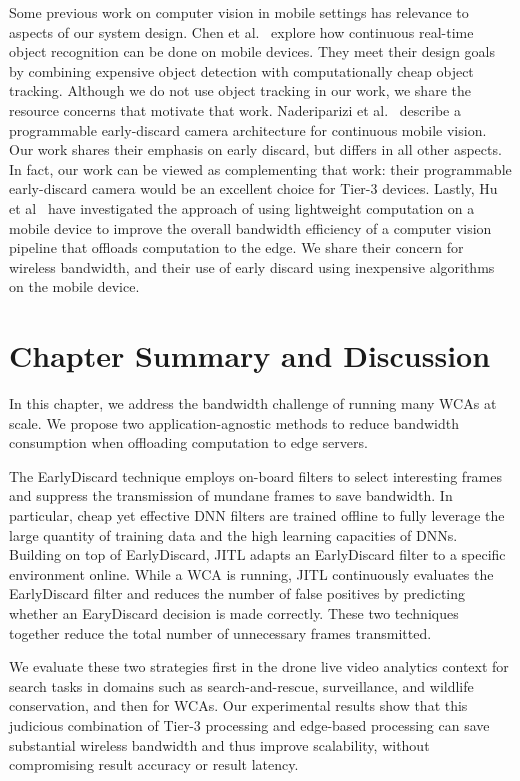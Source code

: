 Some previous work on computer vision in mobile settings has relevance to
aspects of our system design.  Chen et al.~\cite{chen2015glimpse} explore how
continuous real-time object recognition can be done on mobile devices. They meet
their design goals by combining expensive object detection with computationally
cheap object tracking.  Although we do not use object tracking in our work, we
share the resource concerns that motivate that work.  Naderiparizi et
al.~\cite{naderiparizi2017glimpse} describe a programmable early-discard camera
architecture for continuous mobile vision.  Our work shares their emphasis on
early discard, but differs in all other aspects.  In fact, our work can be
viewed as complementing that work: their programmable early-discard camera would
be an excellent choice for Tier-3 devices. Lastly, Hu et al~\cite{Hu2015} have
investigated the approach of using lightweight computation on a mobile device to
improve the overall bandwidth efficiency of a computer vision pipeline that
offloads computation to the edge.  We share their concern for wireless
bandwidth, and their use of early discard using inexpensive algorithms on the
mobile device.

\section{Chapter Summary and Discussion}
\label{bw:discussion}

In this chapter, we address the bandwidth challenge of running many WCAs at
scale. We propose two application-agnostic methods to reduce bandwidth
consumption when offloading computation to edge servers. 

The EarlyDiscard technique employs on-board filters to select interesting frames
and suppress the transmission of mundane frames to save bandwidth. In
particular, cheap yet effective DNN filters are trained offline to fully
leverage the large quantity of training data and the high learning capacities of
DNNs. Building on top of EarlyDiscard, JITL adapts an EarlyDiscard filter to a
specific environment online. While a WCA is running, JITL continuously evaluates
the EarlyDiscard filter and reduces the number of false positives by predicting
whether an EaryDiscard decision is made correctly. These two techniques together
reduce the total number of unnecessary frames transmitted. 

We evaluate these two strategies first in the drone live video analytics context
for search tasks in domains such as search-and-rescue, surveillance, and
wildlife conservation, and then for WCAs. Our experimental results show that
this judicious combination of Tier-3 processing and edge-based processing can
save substantial wireless bandwidth and thus improve scalability, without
compromising result accuracy or result latency. 
